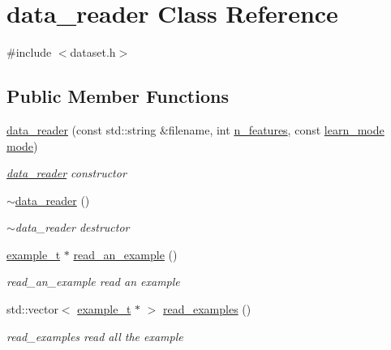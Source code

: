 \hypertarget{classdata__reader}{\section{data\+\_\+reader Class Reference}
\label{classdata__reader}
}


{\ttfamily \#include $<$dataset.\+h$>$}

\subsection*{Public Member Functions}
\begin{DoxyCompactItemize}
\item 
\hyperlink{classdata__reader_abffe82f72b9ccfff618e3c3b0fff774e}{data\+\_\+reader} (const std\+::string \&filename, int \hyperlink{classdata__reader_ab77f1bebd79be09216119e127b463434}{n\+\_\+features}, const \hyperlink{dataset_8h_a87dfee910993320c6720931fb701cc41}{learn\+\_\+mode} \hyperlink{classdata__reader_a4132a7abcf03cca64e2eb204e70fffd3}{mode})
\begin{DoxyCompactList}\small\item\em \hyperlink{classdata__reader}{data\+\_\+reader} constructor \end{DoxyCompactList}\item 
\hyperlink{classdata__reader_afae224dd7295e44e0b4efefe3cb5efdf}{$\sim$data\+\_\+reader} ()
\begin{DoxyCompactList}\small\item\em $\sim$data\+\_\+reader destructor \end{DoxyCompactList}\item 
\hyperlink{classexample__t}{example\+\_\+t} $\ast$ \hyperlink{classdata__reader_ae2ff1315d03cb16c55861a77f08cd87b}{read\+\_\+an\+\_\+example} ()
\begin{DoxyCompactList}\small\item\em read\+\_\+an\+\_\+example read an example \end{DoxyCompactList}\item 
std\+::vector$<$ \hyperlink{classexample__t}{example\+\_\+t} $\ast$ $>$ \hyperlink{classdata__reader_a2fa952493f9f348861c6ba7a0c65a578}{read\+\_\+examples} ()
\begin{DoxyCompactList}\small\item\em read\+\_\+examples read all the example \end{DoxyCompactList}\end{DoxyCompactItemize}
